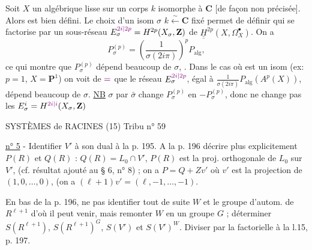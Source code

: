 Soit $X$ un  algébrique lisse sur  un corps $k$ isomorphe à $\mathbf C$ [de façon non précisée]. Alors
est bien défini. Le choix d'un isom $\sigma$ $k\xleftarrow{\sim}\mathbf C$ fixé permet de définir
qui se factorise par un sous-réseau $E_\sigma^{\unsure{2i|2p}}=H^{2p}(X_\sigma,\mathbf Z)$ de $\underline{\underline H}^{2p}(X,\Omega_X^\bullet)$. On a
\[
 P_\sigma^{(p)}=\left(\frac{1}{\sigma(2i\pi)}\right)^p P_{\mathrm{alg}},
\]
ce qui montre que $P_\sigma^{(p)}$ dépend beaucoup de $\sigma$, . Dans le cas où
est un isom (ex: $p=1$, $X=\mathbf P^1$) on voit de $\unsure{=}$ que le réseau $E_\sigma^{\unsure{2i|2p}}$, égal à $\displaystyle\frac{1}{\sigma(2i\pi)}P_{\mathrm{alg}}(A^p(X))$, dépend beaucoup de $\sigma$. \uline{NB}  $\sigma$ par $\bar\sigma$ change $P_\sigma^{(p)}$ en $-P_\sigma^{(p)}$, donc ne change pas les $E_\sigma^i=H^{\unsure{2i|i}}(X_\sigma,\mathbf Z)$


SYSTÈMES de RACINES (15) \hfill Tribu n° 59

\uline{n° 5} - Identifier $V'$ à son dual à la p. 195. A la p. 196 décrire plus explicitement $P(R)$ et $Q(R)$ : $Q(R)=L_0\cap V'$, $P(R)$ est la proj. orthogonale de $L_0$ sur $V'$, (cf. résultat ajouté au § 6, n° 8) ; on a $P=Q+Zv'$ où $v'$ est la projection de $(1,0,\ldots,0)$, (on a $(\ell+1)v'=(\ell,-1,\ldots,-1)$.

En bas de la p. 196, ne pas identifier tout de suite $W$ et le groupe d'autom. de $R^{\ell+1}$ d'où il peut venir, mais remonter $W$ en un groupe $G$ ; déterminer $S(R^{\ell+1})$, $S(R^{\ell+1})^G$, $S(V')$ et $S(V')^W$. Diviser par la factorielle à la l.15, p. 197.

